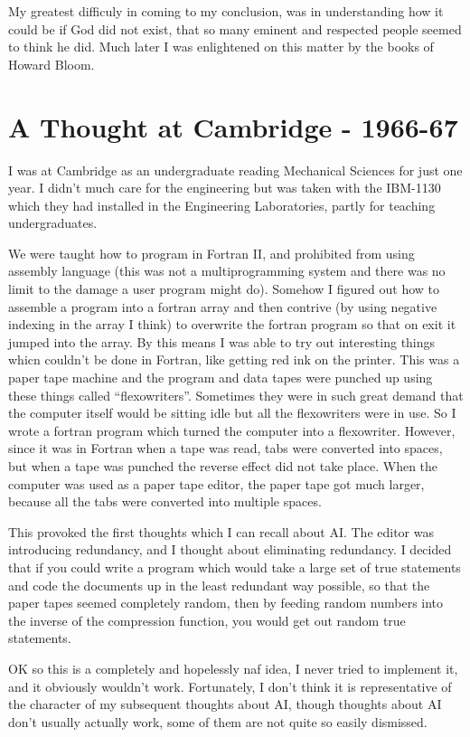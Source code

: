 \documentclass[10pt,titlepage]{book}
\begin{document}
My greatest difficuly in coming to my conclusion, was in understanding how it could be if God did not exist, that so many eminent and respected people seemed to think he did.
Much later I was enlightened on this matter by the books of Howard Bloom.

\section{A Thought at Cambridge - 1966-67}

I was at Cambridge as an undergraduate reading Mechanical Sciences for just one year.
I didn't much care for the engineering but was taken with the IBM-1130 which they had installed in the Engineering Laboratories, partly for teaching undergraduates.

We were taught how to program in Fortran II, and prohibited from using assembly language (this was not a multiprogramming system and there was no limit to the damage a user program might do).
Somehow I figured out how to assemble a program into a fortran array and then contrive (by using negative indexing in the array I think) to overwrite the fortran program so that on exit it jumped into the array.
By this means I was able to try out interesting things whicn couldn't be done in Fortran, like getting red ink on the printer.
This was a paper tape machine and the program and data tapes were punched up using these things called ``flexowriters''.
Sometimes they were in such great demand that the computer itself would be sitting idle but all the flexowriters were in use.
So I wrote a fortran program which turned the computer into a flexowriter.
However, since it was in Fortran when a tape was read, tabs were converted into spaces, but when a tape was punched the reverse effect did not take place.
When the computer was used as a paper tape editor, the paper tape got much larger, because all the tabs were converted into multiple spaces.

This provoked the first thoughts which I can recall about AI.
The editor was introducing redundancy, and I thought about eliminating redundancy.
I decided that if you could write a program which would take a large set of true statements and code the documents up in the least redundant way possible, so that the paper tapes seemed completely random, then by feeding random numbers into the inverse of the compression function, you would get out random true statements.

OK so this is a completely and hopelessly naf idea, I never tried to implement it, and it obviously wouldn't work.
Fortunately, I don't think it is representative of the character of my subsequent thoughts about AI, though thoughts about AI don't usually actually work, some of them are not quite so easily dismissed.
\end{document}
